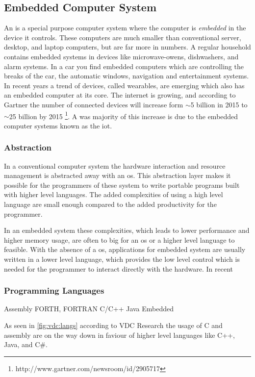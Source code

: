 
\subsection{Embedded Computer System}
An  is a special purpose computer system where the computer is \emph{embedded} in the device it controls.
These computers are much smaller than conventional server, desktop, and laptop computers, but are far more in numbers.
A regular household contains embedded systems in devices like microwave-owens, dishwashers, and alarm systems.
In a car you find embedded computers which are controlling the breaks of the car, the automatic windows, navigation and entertainment systems.
In recent years a trend of devices, called wearables, are emerging which also has an embedded computer at its core.
The internet is growing, and according to Gartner the number of connected devices will increase form $\sim$5 billion in 2015 to $\sim$25 billion by 2015 \footnote{http://www.gartner.com/newsroom/id/2905717}.
A was majority of this increase is due to the embedded computer systems known as the \gls{iot}.

\subsubsection{Abstraction}
In a conventional computer system the hardware interaction and resource management is abstracted away with an \gls{os}.
This abstraction layer makes it possible for the programmers of these system to write portable programs built with higher level languages.
The added complexities of using a high level language are small enough compared to the added productivity for the programmer.

In an embedded system these complexities, which leads to lower performance and higher memory usage, are often to big for an \gls{os} or a higher level language to feasible.
With the absence of a \gls{os}, applications for embedded system are usually written in a lower level language, which provides the low level control which is needed for the programmer to interact directly with the hardware.
In recent

\subsubsection{Programming Languages}


Assembly
FORTH, FORTRAN
C/C++
Java Embedded

As seen in \autoref{fig:vdc:langs} according to VDC Research the usage of C and assembly are on the way down in faviour of higher level languages like C++, Java, and C#.

